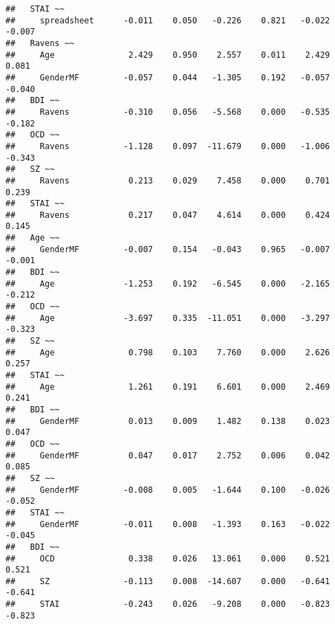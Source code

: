 \documentclass[]{article}
\begin{document}
\begin{verbatim}
##   STAI ~~                                                               
##     spreadsheet      -0.011    0.050   -0.226    0.821   -0.022   -0.007
##   Ravens ~~                                                             
##     Age               2.429    0.950    2.557    0.011    2.429    0.081
##     GenderMF         -0.057    0.044   -1.305    0.192   -0.057   -0.040
##   BDI ~~                                                                
##     Ravens           -0.310    0.056   -5.568    0.000   -0.535   -0.182
##   OCD ~~                                                                
##     Ravens           -1.128    0.097  -11.679    0.000   -1.006   -0.343
##   SZ ~~                                                                 
##     Ravens            0.213    0.029    7.458    0.000    0.701    0.239
##   STAI ~~                                                               
##     Ravens            0.217    0.047    4.614    0.000    0.424    0.145
##   Age ~~                                                                
##     GenderMF         -0.007    0.154   -0.043    0.965   -0.007   -0.001
##   BDI ~~                                                                
##     Age              -1.253    0.192   -6.545    0.000   -2.165   -0.212
##   OCD ~~                                                                
##     Age              -3.697    0.335  -11.051    0.000   -3.297   -0.323
##   SZ ~~                                                                 
##     Age               0.798    0.103    7.760    0.000    2.626    0.257
##   STAI ~~                                                               
##     Age               1.261    0.191    6.601    0.000    2.469    0.241
##   BDI ~~                                                                
##     GenderMF          0.013    0.009    1.482    0.138    0.023    0.047
##   OCD ~~                                                                
##     GenderMF          0.047    0.017    2.752    0.006    0.042    0.085
##   SZ ~~                                                                 
##     GenderMF         -0.008    0.005   -1.644    0.100   -0.026   -0.052
##   STAI ~~                                                               
##     GenderMF         -0.011    0.008   -1.393    0.163   -0.022   -0.045
##   BDI ~~                                                                
##     OCD               0.338    0.026   13.061    0.000    0.521    0.521
##     SZ               -0.113    0.008  -14.607    0.000   -0.641   -0.641
##     STAI             -0.243    0.026   -9.208    0.000   -0.823   -0.823

\end{verbatim}
\end{document}
